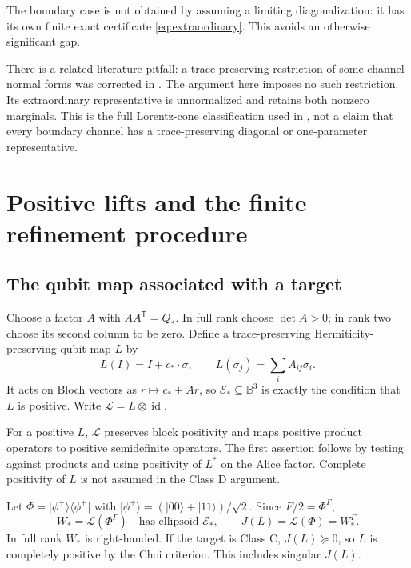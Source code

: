 \documentclass[11pt,a4paper]{article}
\theoremstyle{definition}\newtheorem{definition}[theorem]{Definition}
\newcommand{\id}{\operatorname{id}}
\newcommand{\B}{\mathbb B^3}
\newcommand{\E}{\mathcal E}
\newcommand{\ket}[1]{\lvert #1\rangle}
\newcommand{\bra}[1]{\langle #1\rvert}
\newcommand{\proj}[1]{\ket{#1}\bra{#1}}
\newcommand{\cstar}{c_*}
\newcommand{\Qstar}{Q_*}
\theoremstyle{plain}\newtheorem*{theorem*}{Theorem}
\begin{document}
The boundary case is not obtained by assuming a limiting diagonalization: it has its own finite exact certificate \eqref{eq:extraordinary}. This avoids an otherwise significant gap.

There is a related literature pitfall: a trace-preserving restriction of some channel normal forms was corrected in \cite{davalos2019,davalos2023}. The argument here imposes no such restriction. Its extraordinary representative is unnormalized and retains both nonzero marginals. This is the full Lorentz-cone classification used in \cite{avron}, not a claim that every boundary channel has a trace-preserving diagonal or one-parameter representative.

\section{Positive lifts and the finite refinement procedure}\label{sec:lift}

\subsection{The qubit map associated with a target}

Choose a factor $A$ with $AA^{\mathsf T}=\Qstar$. In full rank choose $\det A>0$; in rank two choose its second column to be zero. Define a trace-preserving Hermiticity-preserving qubit map $L$ by
\begin{equation}\label{eq:L}
 L(I)=I+\cstar\cdot\sigma,
 \qquad L(\sigma_j)=\sum_i A_{ij}\sigma_i.
\end{equation}
It acts on Bloch vectors as $r\mapsto\cstar+Ar$, so $\E_*\subseteq\B$ is exactly the condition that $L$ is positive. Write $\mathscr L=L\otimes\id$.

For a positive $L$, $\mathscr L$ preserves block positivity and maps positive product operators to positive semidefinite operators. The first assertion follows by testing against products and using positivity of $L^*$ on the Alice factor. Complete positivity of $L$ is not assumed in the Class D argument.

Let $\Phi=\proj{\phi^+}$ with $\ket{\phi^+}=(\ket{00}+\ket{11})/\sqrt2$. Since $F/2=\Phi^\Gamma$,
\[
 W_* =\mathscr L(\Phi^\Gamma)
 \quad\text{has ellipsoid }\E_*,
 \qquad J(L)=\mathscr L(\Phi)=W_*^\Gamma.
\]
In full rank $W_*$ is right-handed. If the target is Class C, $J(L)\succeq0$, so $L$ is completely positive by the Choi criterion. This includes singular $J(L)$.
\end{document}
